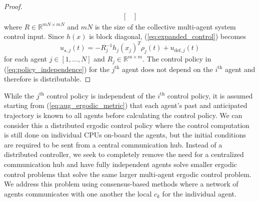 \documentclass[letterpaper, 10 pt, conference]{ieeeconf}  %
\begin{document}
\begin{proof}
{\begin{multline}
\begin{bmatrix}
 \end{bmatrix}
\end{multline}}
where $R\in\mathbb{R}^{mN \times mN}$ and $mN$ is the size of the collective multi-agent system control input.
Since $h(x)$ is block diagonal,  (\ref{eq:expanded_control}) becomes
\begin{equation}\label{eq:policy_independence}
u_{\star,j} (t) = -R_j^{-1} h_j(x_j)^T \rho_j(t) + u_{\text{def},j}(t) 
\end{equation}
for each agent $j \in \left[ 1, \ldots, N \right]$ and $R_j \in \mathbb{R}^{m \times m}$.
The control policy in (\ref{eq:policy_independence}) for the $j^\text{th}$ agent does not depend on the $i^\text{th}$ agent and therefore is distributable.
\end{proof}

While the $j^\text{th}$ control policy is independent of the $i^\text{th}$ control policy, it is assumed starting from (\ref{eq:aug_ergodic_metric}) that each agent's past and anticipated trajectory is known to all agents before calculating the control policy.
We can consider this a distributed ergodic control policy where the control computation is still done on individual CPUs on-board the agents, but the initial conditions are required to be sent from a central communication hub. 
Instead of a distributed controller, we seek to completely remove the need for a centralized communication hub and have fully independent agents solve smaller ergodic control problems that solve the same larger multi-agent ergodic control problem. 
We address this problem using consensus-based methods where a network of agents communicates with one another the local $c_k$ for the individual agent. 
\end{document}
